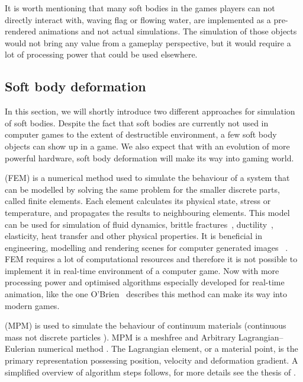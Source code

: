 It is worth mentioning that many soft bodies in the games players can not directly interact with, \eg waving flag or flowing water, are implemented as a pre-rendered animations and not actual simulations. The simulation of those objects would not bring any value from a gameplay perspective, but it would require a lot of processing power that could be used elsewhere. 

\subsection{Soft body deformation}
In this section, we will shortly introduce two different approaches for simulation of soft bodies. Despite the fact that soft bodies are currently not used in computer games to the extent of destructible environment, a few soft body objects can show up in a game. We also expect that with an evolution of more powerful hardware, soft body deformation will make its way into gaming world.
\label{sec:softBody}

 (FEM) is a numerical method used to simulate the behaviour of a system that can be modelled by solving the same problem for the smaller discrete parts, called finite elements. Each element calculates its physical state, \eg stress or temperature, and propagates the results to neighbouring elements. This model can be used for simulation of fluid dynamics, brittle fractures~\cite{brittlefracture}, ductility~\cite{ductilefracture}, elasticity, heat transfer and other physical properties. It is beneficial in engineering, modelling and rendering scenes for computer generated images ~\cite{Bargteil:2007:AFE}. FEM requires a lot of computational resources and therefore it is not possible to implement it in real-time environment of a computer game. Now with more processing power and optimised algorithms especially developed for real-time animation, like the one O'Brien~\cite{femingames} describes this method can make its way into modern games.

 (MPM) is used to simulate the behaviour of continuum materials (continuous mass not discrete particles ). MPM is a meshfree and Arbitrary Lagrangian–Eulerian numerical method \cite{ALE}. The Lagrangian element, or a material point, is the primary representation  possessing position, velocity and deformation gradient. A simplified overview of algorithm steps follows, for more details see the thesis of \citet{jiang2015material}.

